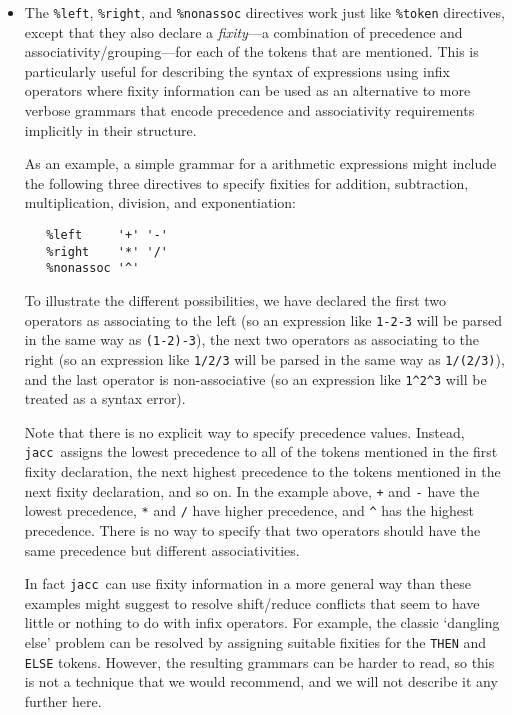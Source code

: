 \documentclass[12pt]{article}
\def\jacc{{\tt jacc}}
\begin{document}
\begin{itemize}
\item The \verb"%left", \verb"%right", and \verb"%nonassoc"
      directives work just like \verb"%token" directives, except
      that they also declare a {\em fixity}---a combination of
      precedence and associativity/grouping---for each of the
      tokens that are mentioned.  This is particularly useful for
      describing the syntax of expressions using infix operators
      where fixity information can be used as an alternative to
      more verbose grammars that encode precedence and associativity
      requirements implicitly in their structure.

      As an example, a simple grammar for a arithmetic expressions
      might include the following three directives to specify fixities
      for addition, subtraction, multiplication, division, and
      exponentiation:
\begin{verbatim}
   %left     '+' '-'
   %right    '*' '/'
   %nonassoc '^'
\end{verbatim}
      To illustrate the different possibilities, we have declared the
      first two operators as associating to the left (so an expression
      like \verb"1-2-3" will be parsed in the same way as
      \verb"(1-2)-3"), the next two operators as associating to
      the right (so an expression like \verb"1/2/3" will be
      parsed in the same way as \verb"1/(2/3)"), and the last
      operator is non-associative (so an expression like
      \verb"1^2^3" will be treated as a syntax error).

      Note that there is no explicit way to specify precedence values.
      Instead, \jacc\ assigns the lowest precedence to all of the tokens
      mentioned in the first fixity declaration, the next highest
      precedence to the tokens mentioned in the next fixity declaration,
      and so on.  In the example above, \verb"+" and \verb"-" have the
      lowest precedence, \verb"*" and \verb"/" have higher precedence,
      and \verb"^" has the highest precedence.  There is no way to
      specify that two operators should have the same precedence but
      different associativities.

      In fact \jacc\ can use fixity information in a more general
      way than these examples might suggest to resolve shift/reduce
      conflicts that seem to have little or nothing to do with
      infix operators.  For example, the classic `dangling else'
      problem can be resolved by assigning suitable fixities for
      the \verb"THEN" and \verb"ELSE" tokens.  However, the
      resulting grammars can be harder to read, so this is
      not a technique that we would recommend, and we will not
      describe it any further here.


\end{itemize}
\end{document}
